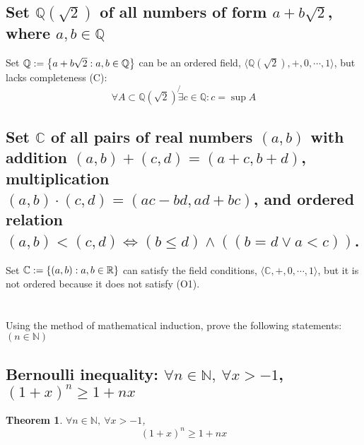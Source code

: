 \documentclass[]{article}
\newcommand{\R}{\mathbb{R}}
\newcommand{\C}{\mathbb{C}}
\newcommand{\N}{\mathbb{N}}
\newcommand{\Q}{\mathbb{Q}}
\newtheorem{theorem}{Theorem}
\begin{document}
\subsection{Set $\Q(\sqrt{2})$ of all numbers of form $a + b\sqrt{2}$, where $a,b\in\Q$}
Set $\Q := \qty{a + b \sqrt{2} : a, b \in \Q}$ can be an ordered field, 
$\langle \Q(\sqrt{2}), +, 0, \cdots, 1\rangle$, but lacks completeness (C):
$$\forall A \subset \Q(\sqrt{2}) \not{\exists} c \in \Q : c = \sup A$$

\subsection{Set $\C$ of all pairs of real numbers $(a,b)$ 
    with addition ${(a,b) + (c,d) = (a+c,b+d)}$, 
    multiplication $(a,b)\cdot(c,d) = (ac-bd,ad+bc)$, 
    and ordered relation $(a,b)<(c,d)\iff(b \leq d)\land((b=d \lor a<c))$.
}
Set $\C := \qty{(a,b) : a,b \in \R}$ can satisfy the field conditions, 
$\langle \C, +, 0, \cdots, 1\rangle$,
but it is not ordered because it does not satisfy (O1).

\newpage
\section{}
Using the method of mathematical induction, 
prove the following statements: $(n \in \N)$

\subsection{Bernoulli inequality: $\forall n\in\N, \ \forall x > -1$,
    $(1+x)^n \geq 1 + nx$
}

\begin{theorem}
    $\forall n\in\N, \ \forall x > -1$, 
        $$(1+x)^n \geq 1 + nx$$
\end{theorem}
\end{document}
